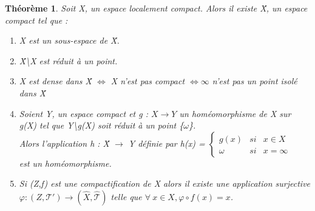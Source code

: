 \documentclass{report}
\theoremstyle{plain}
\newtheorem{theorem}{Théorème}[section]
\newcommand\T{\mathcal{T}}
\newcommand\X{\hat{X}}
\begin{document}
		\begin{theorem} Soit X, un espace localement compact. Alors il existe \^X, un espace compact tel que :
			\begin{enumerate}
				\item X est un sous-espace de \^X.
				\item \^X\textbackslash X est réduit à un point.
				\item X est dense dans \^X $\Longleftrightarrow$ X n'est pas compact $\Longleftrightarrow \infty$ n'est pas un point isolé dans \^X
				\item Soient Y, un espace compact et g : $X \rightarrow Y$ un homéomorphisme de X sur g(X) tel que Y\textbackslash g(X) soit réduit à un point \{$\omega$\}.\\
				Alors l'application h : \^X $\rightarrow$ Y définie par h(x) = $\left\{
					\begin{array}{lll}
						g(x) & si & x\in X\\
						\omega & si & x = \infty
					\end{array}
					\right.$\\
				est un homéomorphisme.
				\item Si (Z,f) est une compactification de X alors il existe une application surjective $\varphi : (Z,\T')\rightarrow (\X,\hat{\T})$ telle que $\forall \:x \in X, \varphi\circ f(x) = x$.
			\end{enumerate}
		\end{theorem}
\end{document}
